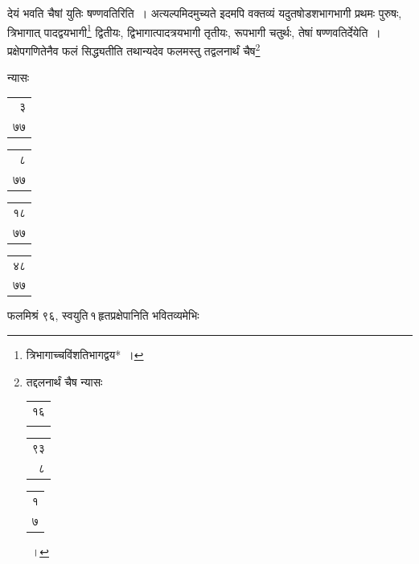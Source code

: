 \documentclass[10pt, openany]{book}
\begin{document}
{{
{देयं भवति चैषां युतिः षण्णवतिरिति~। अत्यल्पमिदमुच्यते इदमपि वक्तव्यं
यदुतषोडशभागभागी}
{प्रथमः पुरुषः, त्रिभागात् पादद्वयभागी\renewcommand{\thefootnote}{\s २}\footnote{\s त्रिभागाच्चविंशतिभागद्वय*~।} द्वितीयः,
द्विभागात्पादत्रयभागी तृतीयः, रूपभागी चतुर्थः,}
{तेषां षण्णवतिर्देयेति~। प्रक्षेपगणितेनैव फलं सिद्ध्यतीति तथान्यदेव
फलमस्तु तद्वलनार्थं चैष\renewcommand{\thefootnote}{\s ३}\footnote{\s तद्दलनार्थं चैष
न्यासः\begin{tabular}{r|}१६\\ \\\hline \end{tabular}\begin{tabular}{r|}९३\\ ८\\\hline \end{tabular}\begin{tabular}{r|}१\\ ७\\\hline \end{tabular}~।}}
{न्यासः\textendash \begin{tabular}{r|}३\\ ७७ \end{tabular}\begin{tabular}{r|} ८\\ ७७\end{tabular} \begin{tabular}{r|}१८\\ ७७\end{tabular}\begin{tabular}{r}४८\\ ७७\end{tabular}फलमिश्रं ९६,
स्वयुति\textendash \,१\textendash \,हृतप्रक्षेपानिति भवितव्यमेभिः}
}}
\end{document}
